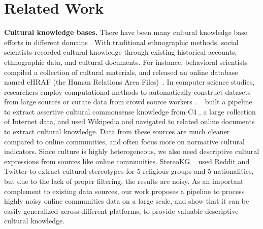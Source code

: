 \documentclass{article} %
\begin{document}
\section{Related Work}
\vspace{-0.5em}
\noindent\textbf{Cultural knowledge bases.} 
There have been many cultural knowledge base efforts in different domains \citep{lee2023crehate, kim2024click, jin2023kobbq, fung2024massively}. 
With traditional ethnographic methods, social scientists recorded cultural knowledge through existing historical accounts, ethnographic data, and cultural documents. For instance, behavioral scientists  compiled a collection of cultural materials, and released an online database named eHRAF (the Human Relations Area Files)~\citep{eHRAF}. In computer science studies, researchers employ computational methods to automatically construct datasets \citep{Smart} from large sources or curate data from crowd source workers \citep{lee2023crehate}. ~\cite{candle2023} built a pipeline to extract assertive cultural commonsense knowledge from C4 \citep{raffel2020exploring}, a large collection of Internet data, and \cite{fung2024massively} used Wikipedia and navigated to related online documents to extract cultural knowledge. Data from these sources are much cleaner compared to online communities, and often focus more on normative cultural indicators. Since culture is highly heterogeneous, we also need descriptive cultural expressions from sources like online communities. StereoKG ~\citep{deshpande2022stereokg} used Reddit and Twitter to extract cultural stereotypes for 5 religious groups and 5 nationalities, but due to the lack of proper filtering, the results are noisy.
As an important complement to existing data sources, our work proposes a pipeline to process highly noisy online communities data on a large scale, and show that it can be easily generalized across different platforms, to provide valuable descriptive cultural knowledge.  %
\end{document}
